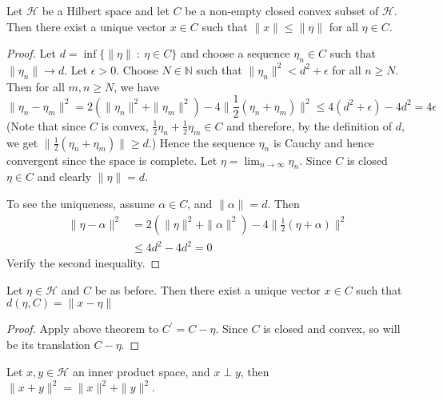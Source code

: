 
\begin{theorem}
  Let $\mathcal{H}$ be a Hilbert space and let $C$ be a non-empty closed convex
  subset of $\mathcal{H}$. Then there exist a unique vector $x \in C$ such that
  $\|x\| \le \|\eta\|$ for all $\eta \in C$.
\end{theorem}
\begin{proof}
  \marginnote{ \scriptsize \textit{\textcolor{red}{construction of the
  proof is a bit tricky}}}
  Let $d = \inf \{ \|\eta\|  \ : \ \eta \in C  \}$ and choose a
  sequence $ \eta_n \in C$  such that $\|\eta_n\| \to d$. Let $
  \epsilon > 0$. Choose $N \in \mathbb{N}$ such that $\|\eta_n\|^2 <
  d^2 + \epsilon$ for all $n \ge N$. Then for all $m,n \ge N$, we have \[
    \|\eta_n - \eta_m\|^2 = 2(\|\eta_n\|^2 + \|\eta_m\|^2) - 4 \|
    \frac{1}{2}(\eta_n + \eta_m) \|^2 \le 4(d^2  + \epsilon) - 4d^2 = 4 \epsilon
  \]
  (Note that since $C$ is convex, $\frac{1}{2}\eta_n +
    \frac{1}{2}\eta_m \in C$ and therefore, by the definition of $d$,
  we get $\|\frac{1}{2}(\eta_n + \eta_m)\| \ge d$.) Hence the sequence
  $\eta_n$ is Cauchy and hence convergent since
  the space is complete. Let $\eta = \lim_{n \to \infty} \eta_n$.
  Since $C$ is closed $\eta \in C$ and clearly $\|\eta\| = d$.

  To see the uniqueness, assume $\alpha \in C$, and $\| \alpha\| = d$. Then
  \begin{align*}
    \|\eta - \alpha\|^2 &= 2(\|\eta\|^2 + \|\alpha\|^2) - 4 \|
    \frac{1}{2}(\eta + \alpha) \|^2 \\
    & \le 4d^2 - 4d^2 = 0
  \end{align*}
  Verify the second inequality.
\end{proof}

\begin{corollary}
  Let $\eta \in \mathcal{H}$ and $C$ be as before. Then there exist a unique
  vector $x \in C$ such that $d(\eta, C) = \|x - \eta\|$
\end{corollary}
\begin{proof}
  Apply above theorem to $C^\prime = C - \eta$. Since $C$ is closed
  and convex, so will be its translation $C - \eta$.
\end{proof}

\begin{proposition}
  \label{PythagorasTheorem}
  Let $ x, y \in \mathcal{H}$ an inner product space, and $x \perp y$, then
  $\|x + y\|^2 = \|x\|^2 + \|y\|^2$.
\end{proposition}


